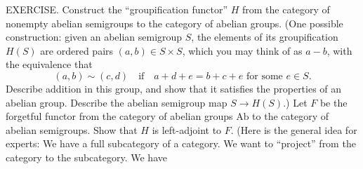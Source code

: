 EXERCISE. Construct the “groupification functor” $H$ from the category of nonempty abelian semigroups to the category of abelian groups. (One possible construction: given an abelian semigroup $S$, the elements of its groupification $H(S)$ are ordered pairs $(a,b)\in S\times S$, which you may think of as $a-b$, with the equivalence that
$$(a,b)\sim(c,d)\quad\text{if}\quad a+d+e=b+c+e\text{ for some }e\in S.$$
Describe addition in this group, and show that it satisfies the properties of an abelian group. Describe the abelian semigroup map $S\to H(S)$.) Let $F$ be the forgetful functor from the category of abelian groups $\mathrm{Ab}$ to the category of abelian semigroups. Show that $H$ is left-adjoint to $F$. (Here is the general idea for experts: We have a full subcategory of a category. We want to “project” from the category to the subcategory. We have

